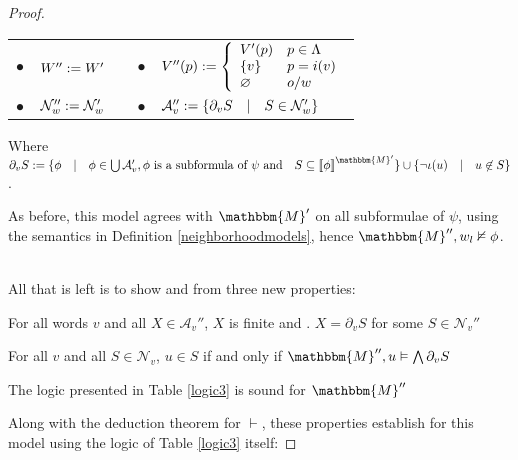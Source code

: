 \begin{proof}
  \begin{center}
    \begin{tabular}{lllll}
      $\bullet$ & $W'' := W'$ &  & $\bullet$ & $V'' (p) := \left\{
      \begin{array}{ll}
        V' (p) & p \in \Lambda\\
        \{v\} & p = i (v)\\
        \varnothing & o / w
      \end{array} \right.$\\
      $\bullet$ & $\mathcal{N}''_w := \mathcal{N}'_w$ & {\hspace{3em}} &
      $\bullet$ & $\mathcal{A}''_v := \{\partial_v S \hspace{1em} |
      \hspace{1em} S \in \mathcal{N}'_w \}$
    \end{tabular}
  \end{center}
  
  
  
  
  
  Where $\partial_v S \assign \{\phi \hspace{1em} | \hspace{1em} \phi \in
  \bigcup \mathcal{A}_v', \text{$\phi$ is a subformula of $\psi$ and}
  \hspace{1em} S \subseteq \left\llbracket \phi
  \right\rrbracket^{\mathbbm{M}'} \} \cup \{\neg \iota (u) \hspace{1em} |
  \hspace{1em} u \nin S\}$.
  
  As before, this model agrees with $\mathbbm{M}'$ on all subformulae of
  $\psi$, using the semantics in Definition \ref{neighborhoodmodels}, hence
  $\mathbbm{M}'', w_l \nvDash \phi$. \
  
  
  
  All that is left is to show  and  from three
  new properties:
  \begin{enumerateroman}
    \item For all words $v$ and all $X \in \mathcal{A}_v''$, $X$ is finite and
  .  $X = \partial_v S$ for some $S \in \mathcal{N}_v''$
    
    \item For all $v$ and all $S \in \mathcal{N}_v$, $u \in S$ if and only if
    $\mathbbm{M}'', u \vDash \bigwedge \partial_v S$
    
    \item The logic presented in Table \ref{logic3} is sound for
    $\mathbbm{M}''$
  \end{enumerateroman}
  Along with the deduction theorem for $\vdash$, these properties establish
   for this model using the logic of Table \ref{logic3} itself:
  

\end{proof}

